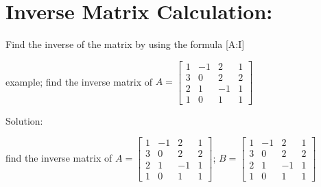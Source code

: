 \documentclass{article}
\begin{document}
    \newpage
    \section*{Inverse Matrix Calculation:}
    \vspace{10pt}
    Find the inverse of the matrix by using the formula [A:I]

    \vspace{10pt}
    example; find the inverse matrix of \( A = \begin{bmatrix} 1 & -1 & 2 & 1 \\ 3 & 0 & 2 & 2 \\ 2 & 1 & -1 & 1 \\ 1 & 0 & 1 & 1 \end{bmatrix} \)

    \vspace{10pt}
    Solution:

    \vspace{10pt}
    \newpage

    find the inverse matrix of
    \hspace*{10pt}
    \( A = \begin{bmatrix} 1 & -1 & 2 & 1 \\ 3 & 0 & 2 & 2 \\ 2 & 1 & -1 & 1 \\ 1 & 0 & 1 & 1 \end{bmatrix} \);  
    \( B = \begin{bmatrix} 1 & -1 & 2 & 1 \\ 3 & 0 & 2 & 2 \\ 2 & 1 & -1 & 1 \\ 1 & 0 & 1 & 1 \end{bmatrix} \)
    
    
\end{document}
